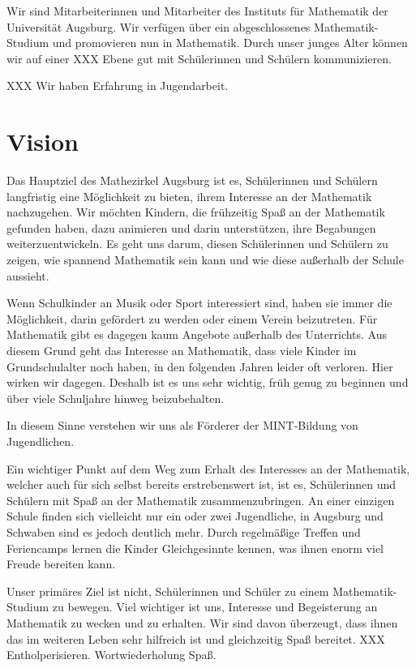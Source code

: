 \documentclass[12pt]{zettel}
\begin{document}
Wir sind Mitarbeiterinnen und Mitarbeiter des Instituts für Mathematik der
Universität Augsburg. Wir verfügen über ein abgeschlossenes Mathematik-Studium
und promovieren nun in Mathematik. Durch unser junges Alter können wir auf
einer XXX Ebene gut mit Schülerinnen und Schülern kommunizieren.

XXX Wir haben Erfahrung in Jugendarbeit.


\section{Vision}

Das Hauptziel des Mathezirkel Augsburg ist es, Schülerinnen und Schülern
langfristig eine Möglichkeit zu bieten, ihrem Interesse an der
Mathematik nachzugehen. Wir möchten Kindern, die frühzeitig Spaß an der
Mathematik gefunden haben, dazu animieren und darin unterstützen, ihre
Begabungen weiterzuentwickeln.
Es geht uns darum, diesen Schülerinnen und
Schülern zu zeigen, wie spannend Mathematik sein kann und wie diese außerhalb der Schule aussieht. 

Wenn Schulkinder an Musik oder Sport interessiert sind, haben sie immer die
Möglichkeit, darin gefördert zu werden oder einem Verein beizutreten. Für
Mathematik gibt es dagegen kaum Angebote außerhalb des Unterrichts. Aus diesem
Grund geht das Interesse an Mathematik, dass viele Kinder im Grundschulalter
noch haben, in den folgenden Jahren leider oft verloren. Hier wirken wir
dagegen. Deshalb ist es uns sehr wichtig, früh genug zu beginnen und über viele
Schuljahre hinweg beizubehalten.

In diesem Sinne verstehen wir uns als Förderer der MINT-Bildung von
Jugendlichen.

Ein wichtiger Punkt auf dem Weg zum Erhalt des Interesses an der
Mathematik, welcher auch für sich selbst bereits erstrebenswert ist, ist es,
Schülerinnen und Schülern mit Spaß an der Mathematik zusammenzubringen.
An einer einzigen Schule finden sich vielleicht
nur ein oder zwei Jugendliche, in Augsburg und Schwaben sind es jedoch
deutlich mehr. Durch regelmäßige Treffen und Feriencamps lernen die
Kinder Gleichgesinnte kennen, was ihnen enorm viel Freude bereiten kann.

Unser primäres Ziel ist nicht, Schülerinnen und Schüler zu einem
Mathematik-Studium zu bewegen. Viel wichtiger ist uns, Interesse und
Begeisterung an Mathematik zu wecken und zu erhalten. Wir sind davon
überzeugt, dass ihnen das im weiteren Leben sehr hilfreich ist und gleichzeitig
Spaß bereitet. XXX Entholperisieren. Wortwiederholung Spaß.
\end{document}

